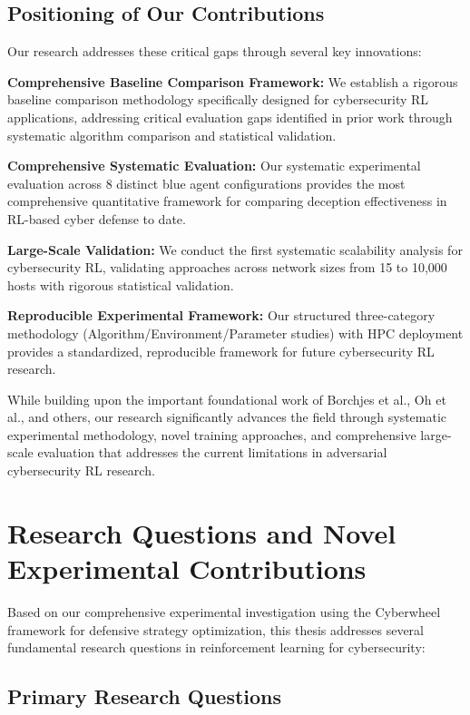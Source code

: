 \documentclass[12pt,twoside]{article}
\theoremstyle{definition}
\theoremstyle{plain}
\begin{document}
\subsection{Positioning of Our Contributions}

Our research addresses these critical gaps through several key innovations:

\textbf{Comprehensive Baseline Comparison Framework:} We establish a rigorous baseline comparison methodology specifically designed for cybersecurity RL applications, addressing critical evaluation gaps identified in prior work through systematic algorithm comparison and statistical validation.

\textbf{Comprehensive Systematic Evaluation:} Our systematic experimental evaluation across 8 distinct blue agent configurations provides the most comprehensive quantitative framework for comparing deception effectiveness in RL-based cyber defense to date.

\textbf{Large-Scale Validation:} We conduct the first systematic scalability analysis for cybersecurity RL, validating approaches across network sizes from 15 to 10,000 hosts with rigorous statistical validation.

\textbf{Reproducible Experimental Framework:} Our structured three-category methodology (Algorithm/Environment/Parameter studies) with HPC deployment provides a standardized, reproducible framework for future cybersecurity RL research.

While building upon the important foundational work of Borchjes et al., Oh et al., and others, our research significantly advances the field through systematic experimental methodology, novel training approaches, and comprehensive large-scale evaluation that addresses the current limitations in adversarial cybersecurity RL research.

\section{Research Questions and Novel Experimental Contributions}

Based on our comprehensive experimental investigation using the Cyberwheel framework for defensive strategy optimization, this thesis addresses several fundamental research questions in reinforcement learning for cybersecurity:

\subsection{Primary Research Questions}
\end{document}
